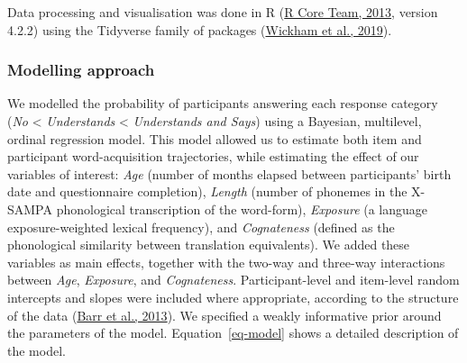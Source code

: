 \documentclass[
]{article}
\begin{document}
Data processing and visualisation was done in R
(\protect\hyperlink{ref-rcoreteam2013language}{R Core Team, 2013},
version 4.2.2) using the Tidyverse family of packages
(\protect\hyperlink{ref-wickham2019welcome}{Wickham et al., 2019}).

\hypertarget{modelling-approach}{%
\subsubsection{Modelling approach}\label{modelling-approach}}

We modelled the probability of participants answering each response
category (\emph{No} \textless{} \emph{Understands} \textless{}
\emph{Understands and Says}) using a Bayesian, multilevel, ordinal
regression model. This model allowed us to estimate both item and
participant word-acquisition trajectories, while estimating the effect
of our variables of interest: \emph{Age} (number of months elapsed
between participants' birth date and questionnaire completion),
\emph{Length} (number of phonemes in the X-SAMPA phonological
transcription of the word-form), \emph{Exposure} (a language
exposure-weighted lexical frequency), and \emph{Cognateness} (defined as
the phonological similarity between translation equivalents). We added
these variables as main effects, together with the two-way and three-way
interactions between \emph{Age}, \emph{Exposure}, and
\emph{Cognateness}. Participant-level and item-level random intercepts
and slopes were included where appropriate, according to the structure
of the data (\protect\hyperlink{ref-barr2013random}{Barr et al., 2013}).
We specified a weakly informative prior around the parameters of the
model. Equation~\ref{eq-model} shows a detailed description of the
model.
\end{document}
